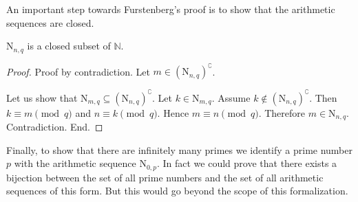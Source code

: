 \documentclass{article}
\newcommand{\N}{\mathrm{N}}
\begin{document}
  An important step towards Furstenberg's proof is to show that the arithmetic
  sequences are closed.

  \begin{forthel}
    \begin{lemma}
      $\N_{n, q}$ is a closed subset of $\mathbb{N}$.
    \end{lemma}
    \begin{proof}
      Proof by contradiction.
      Let $m \in (\N_{n, q})^{\complement}$.

      Let us show that $\N_{m, q} \subseteq (\N_{n, q})^{\complement}$.
        Let $k \in \N_{m, q}$.
        Assume $k \notin (\N_{n, q})^{\complement}$.
        Then $k \equiv m \pmod{q}$ and $n \equiv k \pmod{q}$.
        Hence $m \equiv n \pmod{q}$.
        Therefore $m \in \N_{n, q}$.
        Contradiction.
      End.
    \end{proof}
  \end{forthel}

  Finally, to show that there are infinitely many primes we identify a prime
  number $p$ with the arithmetic sequence $\N_{0, p}$.
  In fact we could prove that there exists a bijection between the set of all
  prime numbers and the set of all arithmetic sequences of this form.
  But this would go beyond the scope of this formalization.
\end{document}
